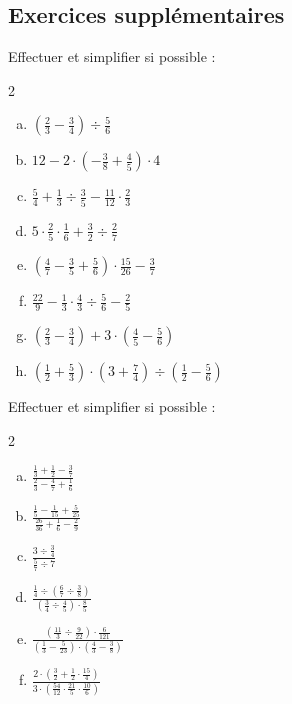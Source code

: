 \documentclass[twoside, a4paper, 12pt, openright, fullpage]{book}
\begin{document}
\subsection{Exercices supplémentaires}

\begin{exercice}\label{fraction4}
Effectuer et simplifier si possible :
\begin{multicols}{2}
\begin{enumerate}[a)]
    \item $\displaystyle \left(\frac{2}{3} -\frac{3}{4}\right) \div \frac{5}{6}$
    \item $\displaystyle 12-2\cdot \left( -\frac{3}{8}+\frac{4}{5}\right) \cdot 4$
    \item $\displaystyle \frac{5}{4}+\frac{1}{3}\div \frac{3}{5}-\frac{11}{12}\cdot \frac{2}{3}$
    \item $\displaystyle 5\cdot \frac{2}{5}\cdot \frac{1}{6}+\frac{3}{2}\div \frac{2}{7}$
    \item $\displaystyle  \left( \frac{4}{7}-\frac{3}{5}+\frac{5}{6}\right) \cdot \frac{15}{26}-\frac{3}{7}$
    \item $\displaystyle \frac{22}{9}-\frac{1}{3}\cdot \frac{4}{3}\div \frac{5}{6}-\frac{2}{5}$
    \item $\displaystyle \left(\frac{2}{3}-\frac{3}{4}\right) + 3\cdot \left( \frac{4}{5}-\frac{5}{6}\right)$
    \item $\displaystyle \left( \frac{1}{2}+\frac{5}{3}\right) \cdot \left( 3+\frac{7}{4}\right) \div \left( \frac{1}{2}-\frac{5}{6}\right)$
    \end{enumerate}
\end{multicols}
\end{exercice}

\begin{exercice}\label{fraction5}
Effectuer et simplifier si possible :
\begin{multicols}{2}
\begin{enumerate}[a)]
    \item $\displaystyle \frac{\frac{1}{3}+\frac{1}{2}-\frac{3}{7}}{\frac{2}{3}-\frac{4}{7}+\frac{1}{6}}$
    \item $\displaystyle \frac{\frac{1}{5}-\frac{1}{15}+\frac{5}{25}}{\frac{26}{36}+\frac{1}{6}-\frac{2}{9}}$
    \item $\displaystyle \frac{3\div\frac{3}{4}}{\frac{5}{7}\div 7}$
    \item $\displaystyle \frac{\frac{1}{4}\div\left(\frac{6}{7}\div\frac{3}{8}\right)}{\left(\frac{3}{4}\div\frac{4}{5}\right) \cdot \frac{8}{5}}$
    \item $\displaystyle \frac{\left(\frac{11}{3}\div \frac{9}{22}\right) \cdot \frac{6}{121}}{\left(\frac{1}{3}-\frac{5}{23}\right)\cdot \left(\frac{4}{3}-\frac{3}{8}\right)}$
    \item $\displaystyle \frac{2\cdot \left(\frac{3}{2}+\frac{1}{2}\cdot \frac{15}{4}\right)}{3\cdot \left(\frac{54}{12}\cdot \frac{21}{5}\cdot \frac{10}{6}\right)}$
    \end{enumerate}
\end{multicols}
\end{exercice}
\end{document}

